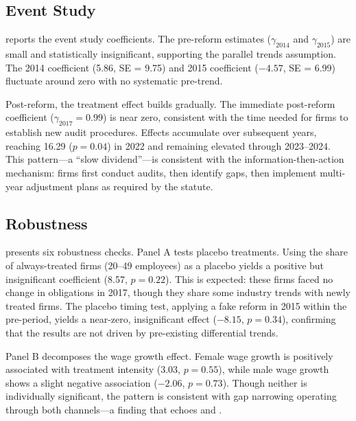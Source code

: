 \documentclass[12pt]{article}
\begin{document}
\subsection{Event Study}



 reports the event study coefficients. The pre-reform estimates ($\gamma_{2014}$ and $\gamma_{2015}$) are small and statistically insignificant, supporting the parallel trends assumption. The 2014 coefficient (5.86, SE = 9.75) and 2015 coefficient ($-4.57$, SE = 6.99) fluctuate around zero with no systematic pre-trend.

Post-reform, the treatment effect builds gradually. The immediate post-reform coefficient ($\gamma_{2017} = 0.99$) is near zero, consistent with the time needed for firms to establish new audit procedures. Effects accumulate over subsequent years, reaching 16.29 ($p = 0.04$) in 2022 and remaining elevated through 2023--2024. This pattern---a ``slow dividend''---is consistent with the information-then-action mechanism: firms first conduct audits, then identify gaps, then implement multi-year adjustment plans as required by the statute.

\subsection{Robustness}



 presents six robustness checks. Panel A tests placebo treatments. Using the share of always-treated firms (20--49 employees) as a placebo yields a positive but insignificant coefficient (8.57, $p = 0.22$). This is expected: these firms faced no change in obligations in 2017, though they share some industry trends with newly treated firms. The placebo timing test, applying a fake reform in 2015 within the pre-period, yields a near-zero, insignificant effect ($-8.15$, $p = 0.34$), confirming that the results are not driven by pre-existing differential trends.

Panel B decomposes the wage growth effect. Female wage growth is positively associated with treatment intensity (3.03, $p = 0.55$), while male wage growth shows a slight negative association ($-2.06$, $p = 0.73$). Though neither is individually significant, the pattern is consistent with gap narrowing operating through both channels---a finding that echoes \citet{bennedsen2022firms} and \citet{duchini2020pay}.
\end{document}
